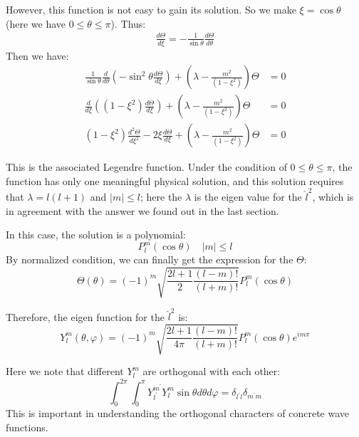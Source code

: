 However, this function is not easy to gain its solution. So we make
$\xi = \cos \theta$ (here we have $0\leq\theta\leq\pi$). Thus:
\begin{align}\label{}
\frac{d\Theta}{d \xi} = -\frac{1}{\sin \theta}\frac{d\Theta}{d
\theta}
\end{align}
Then we have:
\begin{align}\label{}
\frac{1}{\sin\theta}\frac{d}{d
\theta}\left(-\sin^{2}\theta\frac{d\Theta}{d \xi}\right) +
\left(\lambda - \frac{m^{2}}{(1-\xi^{2})}\right)\Theta &= 0
\nonumber \\
\frac{d}{d \xi}\left((1-\xi^{2})\frac{d\Theta}{d \xi}\right) +
\left(\lambda -
\frac{m^{2}}{(1-\xi^{2})}\right)\Theta &= 0 \nonumber \\
(1-\xi^{2})\frac{d^{2}\Theta}{d \xi^{2}} - 2\xi\frac{d\Theta}{d \xi}
+ \left(\lambda - \frac{m^{2}}{(1-\xi^{2})}\right)\Theta &= 0
\end{align}

This is the associated Legendre function. Under the condition of
$0\leq\theta\leq\pi$, the function has only one meaningful physical
solution, and this solution requires that $\lambda = l(l+1)$ and
$|m| \leq l$; here the $\lambda$ is the eigen value for the
$\hat{l}^{2}$, which is in agreement with the answer we found out in
the last section.

In this case, the solution is a polynomial:
\begin{equation}\label{}
P^{m}_{l}(\cos\theta) \quad |m| \leq l
\end{equation}
By normalized condition, we can finally get the expression for the
$\Theta$:
\begin{equation}\label{}
\Theta(\theta) =
(-1)^{m}\sqrt{\frac{2l+1}{2}\frac{(l-m)!}{(l+m)!}}P^{m}_{l}(\cos\theta)
\end{equation}

Therefore, the eigen function for the $\hat{l}^{2}$ is:
\begin{equation}\label{}
Y^{m}_{l}(\theta, \varphi) =
(-1)^{m}\sqrt{\frac{2l+1}{4\pi}\frac{(l-m)!}{(l+m)!}}P^{m}_{l}(\cos\theta)e^{im\pi}
\end{equation}

Here we note that different $Y^{m}_{l}$ are orthogonal with each
other:
\begin{equation}\label{}
\int_{0}^{2\pi}\int_{0}^{\pi}Y^{m^{'}}_{l^{'}}Y^{m}_{l}\sin\theta
d\theta d\varphi = \delta_{l^{'}l}\delta_{m^{'}m}
\end{equation}
This is important in understanding the orthogonal characters of
concrete wave functions.

